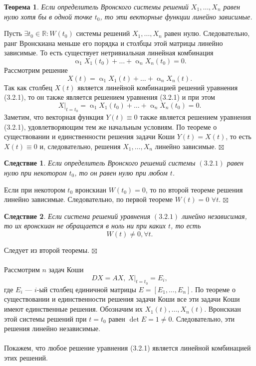 \documentclass[a4paper, 12pt]{report}
\newenvironment{Proof} %
{\par\noindent{$\blacklozenge$}} %
{\hfill$\scriptstyle\boxtimes$}
\newcommand{\Rm}{\mathbb{R}}
\renewcommand{\alpha}{\upalpha}
\newtheorem*{theorem}{Теорема}
\newtheorem*{cor}{Следствие}
\begin{document}
\begin{theorem}
	Если определитель Вронского системы решений  $X_1,\ldots,X_n$ равен нулю хотя бы в одной точке $t_0$, то эти векторные функции линейно зависимые.
\end{theorem}\begin{Proof}
Пусть $\exists t_0 \in \Rm : W(t_0)$ системы решений $X_1,\ldots,X_n$ равен нулю. Следовательно, ранг Вронскиана меньше его порядка и столбцы этой матрицы линейно зависимые. То есть существует нетривиальная линейная комбинация $$\alpha_1X_1(t_0) + \ldots +  \alpha_nX_n(t_0) = 0.$$ Рассмотрим решение $$X(t) =  \alpha_1X_1(t) + \ldots +  \alpha_nX_n(t).$$ Так как столбец $X(t)$ является линейной комбинацией решений уравнения (3.2.1), то он также является решением уравнения (3.2.1) и при этом $$X|_{t=t_0} =  \alpha_1X_1(t_0) + \ldots +  \alpha_nX_n(t_0) = 0.$$
Заметим, что векторная функция $Y(t)\equiv 0$ также является решением уравнения (3.2.1), удовлетворяющим тем же начальным условиям. По теореме о существовании и единственности решения задачи Коши $Y(t) = X(t)$, то есть $X(t)\equiv 0$ и, следовательно, решения $X_1,\ldots,X_n$ линейно зависимые.
\end{Proof}
\begin{cor}
	Если определитель Вронского решений системы $(3.2.1)$ равен нулю при некотором $t_0$, то он равен нулю при любом $t$.
\end{cor}\begin{Proof}
Если при некотором $t_0$ вронскиан $W(t_0) = 0 $, то по второй теореме решения линейно зависимые. Следовательно, по первой теореме $W(t) = 0$ $\forall t$.
\end{Proof}\begin{cor}
Если система решений уравнения $(3.2.1)$ линейно независимая, то их вронскиан не обращается в ноль ни при каких $t$, то есть $$W(t) \ne 0, \forall t.$$
\end{cor}\begin{Proof}
Следует из второй теоремы.
\end{Proof}\\\\
Рассмотрим $n$ задач Коши $$DX = AX,\ X|_{t=t_0} = E_i,$$ где $E_i$ --- $i$-ый столбец единичной матрицы $E = [E_1,\ldots, E_n]$. По теореме о существовании и единственности решения задачи Коши все эти задачи Коши имеют единственные решения. Обозначим их $X_1(t),\ldots,X_n(t)$. Вронскиан этой системы решений при $t=t_0$ равен $\det E = 1\ne 0$. Следовательно, эти решения линейно независимые.\\\\ Покажем, что любое решение уравнения (3.2.1) является линейной комбинацией этих решений.
\end{document}
